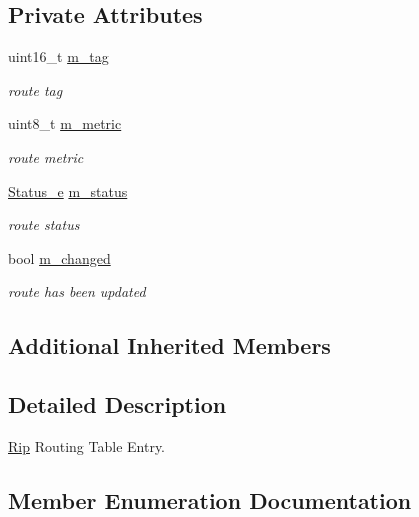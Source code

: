 \subsection*{Private Attributes}
\begin{DoxyCompactItemize}
\item 
uint16\+\_\+t \hyperlink{classns3_1_1RipRoutingTableEntry_af1d92d746099aff8abb60912a9137630}{m\+\_\+tag}
\begin{DoxyCompactList}\small\item\em route tag \end{DoxyCompactList}\item 
uint8\+\_\+t \hyperlink{classns3_1_1RipRoutingTableEntry_aab183e8319bb0b85c22a2b1c6ede4d43}{m\+\_\+metric}
\begin{DoxyCompactList}\small\item\em route metric \end{DoxyCompactList}\item 
\hyperlink{classns3_1_1RipRoutingTableEntry_a4326145be5c3027f2ddf9eb80b6127a4}{Status\+\_\+e} \hyperlink{classns3_1_1RipRoutingTableEntry_a02a11ffe6a1d36a14919db77ac7825cf}{m\+\_\+status}
\begin{DoxyCompactList}\small\item\em route status \end{DoxyCompactList}\item 
bool \hyperlink{classns3_1_1RipRoutingTableEntry_a1e7c17933472ed89d046e3bd50eb7766}{m\+\_\+changed}
\begin{DoxyCompactList}\small\item\em route has been updated \end{DoxyCompactList}\end{DoxyCompactItemize}
\subsection*{Additional Inherited Members}


\subsection{Detailed Description}
\hyperlink{classns3_1_1Rip}{Rip} Routing Table Entry. 

\subsection{Member Enumeration Documentation}
